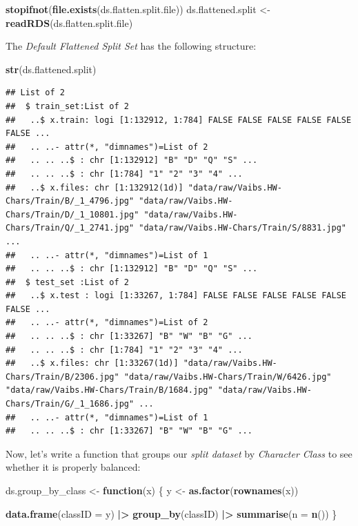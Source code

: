 \documentclass[
]{report}
\newenvironment{Shaded}{\begin{snugshade}}{\end{snugshade}}
\newcommand{\AttributeTok}[1]{\textcolor[rgb]{0.13,0.29,0.53}{#1}}
\newcommand{\ControlFlowTok}[1]{\textcolor[rgb]{0.13,0.29,0.53}{\textbf{#1}}}
\newcommand{\FunctionTok}[1]{\textcolor[rgb]{0.13,0.29,0.53}{\textbf{#1}}}
\newcommand{\NormalTok}[1]{#1}
\newcommand{\OtherTok}[1]{\textcolor[rgb]{0.56,0.35,0.01}{#1}}
\newcommand{\SpecialCharTok}[1]{\textcolor[rgb]{0.81,0.36,0.00}{\textbf{#1}}}
\begin{document}
\begin{Shaded}
\begin{Highlighting}[]
\FunctionTok{stopifnot}\NormalTok{(}\FunctionTok{file.exists}\NormalTok{(ds.flatten.split.file))}
\NormalTok{ds.flattened.split }\OtherTok{\textless{}{-}} \FunctionTok{readRDS}\NormalTok{(ds.flatten.split.file)}
\end{Highlighting}
\end{Shaded}

\newpage

The \emph{Default Flattened Split Set} has the following structure:

\begin{Shaded}
\begin{Highlighting}[]
\FunctionTok{str}\NormalTok{(ds.flattened.split)}
\end{Highlighting}
\end{Shaded}

\begin{verbatim}
## List of 2
##  $ train_set:List of 2
##   ..$ x.train: logi [1:132912, 1:784] FALSE FALSE FALSE FALSE FALSE FALSE ...
##   .. ..- attr(*, "dimnames")=List of 2
##   .. .. ..$ : chr [1:132912] "B" "D" "Q" "S" ...
##   .. .. ..$ : chr [1:784] "1" "2" "3" "4" ...
##   ..$ x.files: chr [1:132912(1d)] "data/raw/Vaibs.HW-Chars/Train/B/_1_4796.jpg" "data/raw/Vaibs.HW-Chars/Train/D/_1_10801.jpg" "data/raw/Vaibs.HW-Chars/Train/Q/_1_2741.jpg" "data/raw/Vaibs.HW-Chars/Train/S/8831.jpg" ...
##   .. ..- attr(*, "dimnames")=List of 1
##   .. .. ..$ : chr [1:132912] "B" "D" "Q" "S" ...
##  $ test_set :List of 2
##   ..$ x.test : logi [1:33267, 1:784] FALSE FALSE FALSE FALSE FALSE FALSE ...
##   .. ..- attr(*, "dimnames")=List of 2
##   .. .. ..$ : chr [1:33267] "B" "W" "B" "G" ...
##   .. .. ..$ : chr [1:784] "1" "2" "3" "4" ...
##   ..$ x.files: chr [1:33267(1d)] "data/raw/Vaibs.HW-Chars/Train/B/2306.jpg" "data/raw/Vaibs.HW-Chars/Train/W/6426.jpg" "data/raw/Vaibs.HW-Chars/Train/B/1684.jpg" "data/raw/Vaibs.HW-Chars/Train/G/_1_1686.jpg" ...
##   .. ..- attr(*, "dimnames")=List of 1
##   .. .. ..$ : chr [1:33267] "B" "W" "B" "G" ...
\end{verbatim}

\protect{}\label{func.ds.group_by_class}
Now, let's write a function that groups our \emph{split dataset} by \emph{Character Class} to see whether it is properly balanced:

\begin{Shaded}
\begin{Highlighting}[]
\NormalTok{ds.group\_by\_class }\OtherTok{\textless{}{-}} \ControlFlowTok{function}\NormalTok{(x) \{}
\NormalTok{  y }\OtherTok{\textless{}{-}} \FunctionTok{as.factor}\NormalTok{(}\FunctionTok{rownames}\NormalTok{(x))}

  \FunctionTok{data.frame}\NormalTok{(}\AttributeTok{classID =}\NormalTok{ y) }\SpecialCharTok{|\textgreater{}} 
    \FunctionTok{group\_by}\NormalTok{(classID) }\SpecialCharTok{|\textgreater{}}
    \FunctionTok{summarise}\NormalTok{(}\AttributeTok{n =} \FunctionTok{n}\NormalTok{())  }
\NormalTok{\}}
\end{Highlighting}
\end{Shaded}
\end{document}
